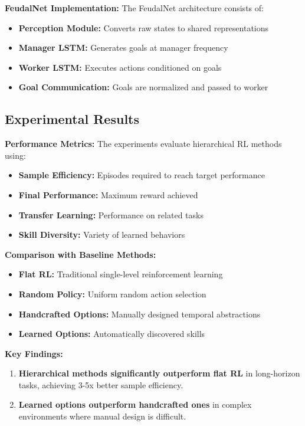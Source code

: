 \documentclass[12pt]{article}
\begin{document}
{{\textbf{FeudalNet Implementation:}
The FeudalNet architecture consists of:
\begin{itemize}
    \item \textbf{Perception Module:} Converts raw states to shared representations
    \item \textbf{Manager LSTM:} Generates goals at manager frequency
    \item \textbf{Worker LSTM:} Executes actions conditioned on goals
    \item \textbf{Goal Communication:} Goals are normalized and passed to worker
\end{itemize}

\subsection{Experimental Results}

\textbf{Performance Metrics:}
The experiments evaluate hierarchical RL methods using:
\begin{itemize}
    \item \textbf{Sample Efficiency:} Episodes required to reach target performance
    \item \textbf{Final Performance:} Maximum reward achieved
    \item \textbf{Transfer Learning:} Performance on related tasks
    \item \textbf{Skill Diversity:} Variety of learned behaviors
\end{itemize}

\textbf{Comparison with Baseline Methods:}
\begin{itemize}
    \item \textbf{Flat RL:} Traditional single-level reinforcement learning
    \item \textbf{Random Policy:} Uniform random action selection
    \item \textbf{Handcrafted Options:} Manually designed temporal abstractions
    \item \textbf{Learned Options:} Automatically discovered skills
\end{itemize}

\textbf{Key Findings:}
\begin{enumerate}
    \item \textbf{Hierarchical methods significantly outperform flat RL} in long-horizon tasks, achieving 3-5x better sample efficiency.
    
    \item \textbf{Learned options outperform handcrafted ones} in complex environments where manual design is difficult.
    

\end{enumerate}}}
\end{document}

